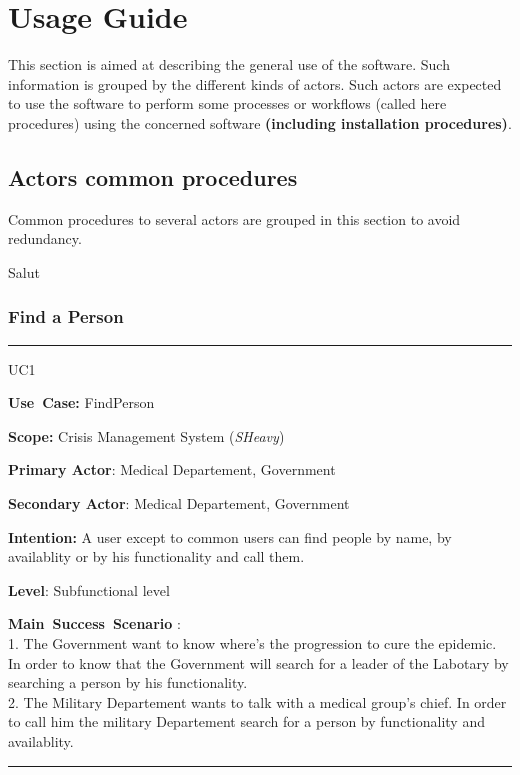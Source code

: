 \chapter{Usage Guide}
\label{chap:usage_guide}

This section is aimed at describing the general use of the software. Such
information is grouped by the different kinds of actors.
Such actors are expected to use the software to perform some
processes or workflows (called here procedures) using the concerned software
\textbf{(including installation procedures)}.

\section{Actors common procedures}
Common procedures to several actors are grouped in this section to avoid
redundancy.

Salut

\subsection{Find a Person}
\vspace{0.5cm}
\hrule
\vspace{0.5cm}
\begin{lyxlist}{UC1}
\small{
\item [\textbf{Use~Case:}] FindPerson
\item [\textbf{Scope:}] Crisis Management System (\emph{SHeavy})
\item [\textbf{Primary Actor}:] Medical Departement, Government
\item [\textbf{Secondary Actor}:] Medical Departement, Government
\item [\textbf{Intention:}]A user except to common users can find people by name, by availablity or by
his functionality and call them.
\item [\textbf{Level}:]Subfunctional level
\item [\textbf{Main~Success~Scenario}]:\\
1. The Government want to know where's the progression to cure the epidemic. In
order to know that the Government will search for a leader of the Labotary by
searching a person by his functionality.\\
2. The Military Departement wants to talk with a medical group's chief. In order
to call him the military Departement search for a person by functionality and
availablity.\\
}
\end{lyxlist}
\hrule 
\vspace{0.5cm} 

